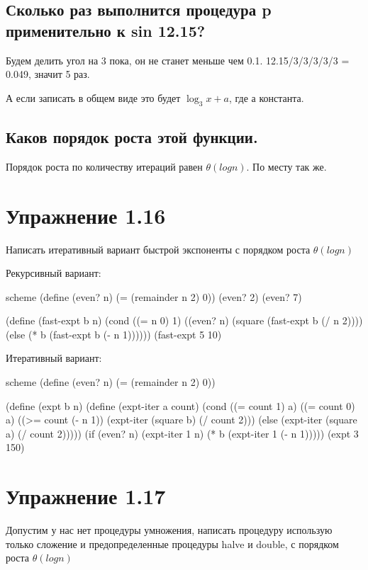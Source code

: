 \section{Сколько раз выполнится процедура p применительно к sin 12.15?}

Будем делить угол на 3 пока, он не станет меньше чем 0.1. 12.15/3/3/3/3/3 = 0.049, значит 5 раз.

А если записать в общем виде это будет $\log_3{x} + a$, где а константа.

\section{Каков порядок роста этой функции.}

Порядок роста по количеству итераций равен $\theta(log{n})$.
По месту так же.

\chapter{Упражнение 1.16}

Написать итеративный вариант быстрой экспоненты с порядком роста $\theta(log{n})$

Рекурсивный вариант:
\begin{codelisting}{scheme}
(define (even? n)
  (= (remainder n 2) 0))
(even? 2)
(even? 7)

(define (fast-expt b n)
  (cond ((= n 0) 1)
        ((even? n) (square (fast-expt b (/ n 2))))
        (else (* b (fast-expt b (- n 1))))))
(fast-expt 5 10)
\end{codelisting}

Итеративный вариант:
\begin{codelisting}{scheme}
(define (even? n)
  (= (remainder n 2) 0))

(define (expt b n)
  (define (expt-iter a count)
    (cond ((= count 1) a)
          ((= count 0) a)
          ((>= count (- n 1)) (expt-iter (square b) (/ count 2)))
          (else (expt-iter (square a) (/ count 2)))))
  (if (even? n)
      (expt-iter 1 n)
      (* b (expt-iter 1 (- n 1)))))
(expt 3 150)
\end{codelisting}


\chapter{Упражнение 1.17}

Допустим у нас нет процедуры умножения, написать процедуру использую только сложение и предопределенные процедуры halve и double, с порядком роста $\theta(log{n})$

